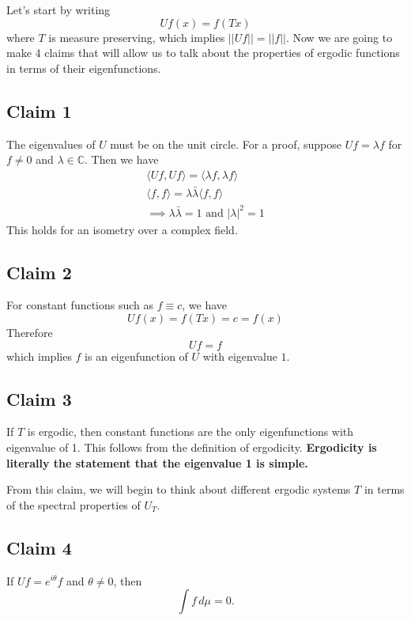 \documentclass{article}
\begin{document}
Let's start by writing 
\[
Uf(x) = f(Tx)
\]
where $T$ is measure preserving, which implies $\left|\left| Uf \right|\right| = \left|\left| f \right|\right|$. Now we are going to make 4 claims that will allow us to talk about the properties of ergodic functions in terms of their eigenfunctions.

\subsection{Claim 1}

The eigenvalues of $U$ must be on the unit circle. For a proof, suppose $Uf=\lambda f$ for $f\neq 0$ and $\lambda\in\mathbb{C}$. Then we have 
\begin{gather*}
    \langle Uf, Uf\rangle = \langle \lambda f, \lambda f \rangle\\
    \langle f, f\rangle = \lambda\bar{\lambda} \langle f, f\rangle \\
    \implies \lambda\bar{\lambda} = 1 \text{ and }\left|\lambda\right|^2 =1
\end{gather*}
This holds for an isometry over a complex field.

\subsection{Claim 2}

For constant functions such as $f\equiv c$, we have 
\[
Uf(x)=f(Tx) = c = f(x)
\]
Therefore
\[
Uf = f
\]
which implies $f$ is an eigenfunction of $U$ with eigenvalue $1$.

\subsection{Claim 3}

If $T$ is ergodic, then constant functions are the only eigenfunctions with eigenvalue of 1. This follows from the definition of ergodicity. \textbf{Ergodicity is literally the statement that the eigenvalue 1 is simple.} 

From this claim, we will begin to think about different ergodic systems $T$ in terms of the spectral properties of $U_T$.

\subsection{Claim 4}

If $Uf=e^{i\theta}f$ and $\theta\neq 0$, then 
\[
\int f\, d\mu=0.
\]
\end{document}
